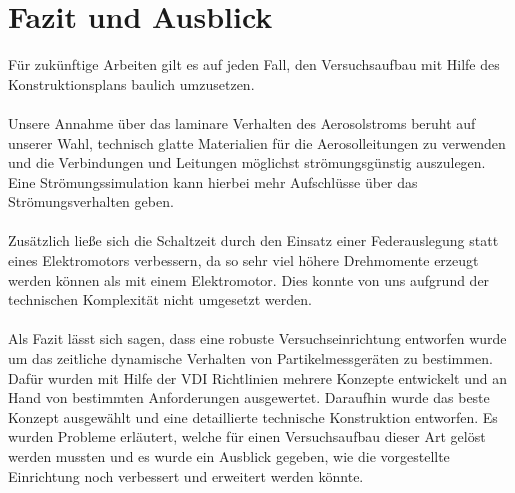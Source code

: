 \section{Fazit und Ausblick}
F\"{u}r zuk\"{u}nftige Arbeiten gilt es auf jeden Fall, den Versuchsaufbau mit Hilfe des Konstruktionsplans baulich umzusetzen.
\\\\
Unsere Annahme \"{u}ber das laminare Verhalten des Aerosolstroms beruht auf unserer Wahl, technisch glatte Materialien f\"{u}r die Aerosolleitungen zu verwenden und die Verbindungen und Leitungen m\"{o}glichst str\"{o}mungsg\"{u}nstig auszulegen. Eine Str\"{o}mungssimulation kann hierbei mehr Aufschl\"{u}sse \"{u}ber das Str\"{o}mungsverhalten geben.
\\\\
Zus\"{a}tzlich lie{\ss}e sich die Schaltzeit durch den Einsatz einer Federauslegung statt eines Elektromotors verbessern, da so sehr viel h\"{o}here Drehmomente erzeugt werden k\"{o}nnen als mit einem Elektromotor. Dies konnte von uns aufgrund der technischen Komplexit\"{a}t nicht umgesetzt werden.
\\\\
Als Fazit l\"{a}sst sich sagen, dass eine robuste Versuchseinrichtung entworfen wurde um das zeitliche dynamische Verhalten von Partikelmessger\"{a}ten zu bestimmen. Daf\"{u}r wurden mit Hilfe der VDI Richtlinien mehrere Konzepte entwickelt und an Hand von bestimmten Anforderungen ausgewertet. Daraufhin wurde das beste Konzept ausgew\"{a}hlt und eine detaillierte technische Konstruktion entworfen. Es wurden Probleme erl\"{a}utert, welche f\"{u}r einen Versuchsaufbau dieser Art gel\"{o}st werden mussten und es wurde ein Ausblick gegeben, wie die vorgestellte Einrichtung noch verbessert und erweitert werden k\"{o}nnte.